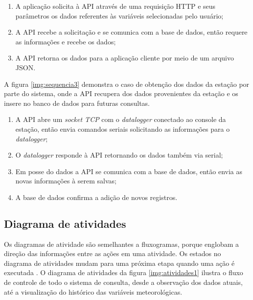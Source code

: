 
\newpage

\begin{enumerate}
        \item A aplicação solicita à API através de uma requisição HTTP e seus parâmetros os dados referentes às variáveis selecionadas pelo usuário;
        \item A API recebe a solicitação e se comunica com a base de dados, então requere as informações e recebe os dados;
        \item A API retorna os dados para a aplicação cliente por meio de um arquivo JSON.
\end{enumerate}

A figura \ref{img:sequencia3} demonstra o caso de obtenção dos dados da estação por parte do sistema, onde a API recupera dos dados provenientes da estação e os insere no banco de dados para futuras consultas.

\newpage
{}

\begin{enumerate}
        \item A API abre um \textit{socket TCP} com o \textit{datalogger} conectado ao console da estação, então envia comandos seriais solicitando as informações para o \textit{datalogger};
        \item O \textit{datalogger} responde à API retornando os dados também via serial;
        \item Em posse do dados a API se comunica com a base de dados, então envia as novas informações à serem salvas;
        \item A base de dados confirma a adição de novos registros.
\end{enumerate}

\subsection{Diagrama de atividades} \label{subsec:diagAtiv}

Os diagramas de atividade são semelhantes a fluxogramas, porque englobam a direção das informações entre as ações em uma atividade. Os estados no diagrama de atividades mudam para uma próxima etapa quando uma ação é executada \cite{SITEDIAGATIV}.  O diagrama de atividades da figura \ref{img:atividades1} ilustra o fluxo de controle de todo o sistema de consulta, desde a observação dos dados atuais, até a visualização do histórico das variáveis meteorológicas.

